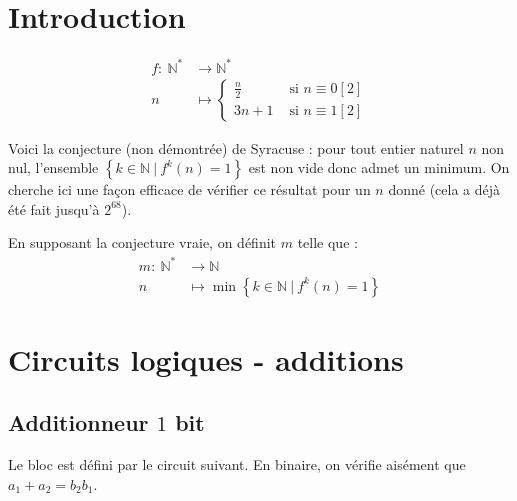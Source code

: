 \documentclass{hibiscus}
\begin{document}
\maketitle
\tableofcontents

\section{Introduction}

\begin{equation*}
\begin{aligned}
f: \: \mathbb{N}^* & \longrightarrow \mathbb{N}^* \\
        n & \longmapsto \begin{cases} \frac{n}{2} & \text{ si } n \equiv 0 [2]
        \\ 3n + 1 & \text{ si } n \equiv 1 [2] \end{cases}
\end{aligned}
\end{equation*}

\par Voici la conjecture (non démontrée) de Syracuse : pour tout entier naturel $n$ non nul, l'ensemble $\left\{ k \in \mathbb{N} \: | \: f^k(n) = 1 \right\}$ est non vide donc admet un minimum. On cherche ici une façon efficace de vérifier ce résultat pour un $n$ donné (cela a déjà été fait jusqu'à $2^{68}$).

\par En supposant la conjecture vraie, on définit $m$ telle que :
\begin{equation*}
\begin{aligned}
m: \: \mathbb{N}^* & \longrightarrow \mathbb{N} \\
        n & \longmapsto \min \left\{ k \in \mathbb{N} \: | \: f^k(n) = 1 \right\}
\end{aligned}
\end{equation*}

\newpage \section{Circuits logiques - additions}

\subsection{Additionneur $1$ bit}

\par Le bloc  est défini par le circuit suivant. En binaire, on vérifie aisément que $a_1 + a_2 = b_2b_1$.
\end{document}
